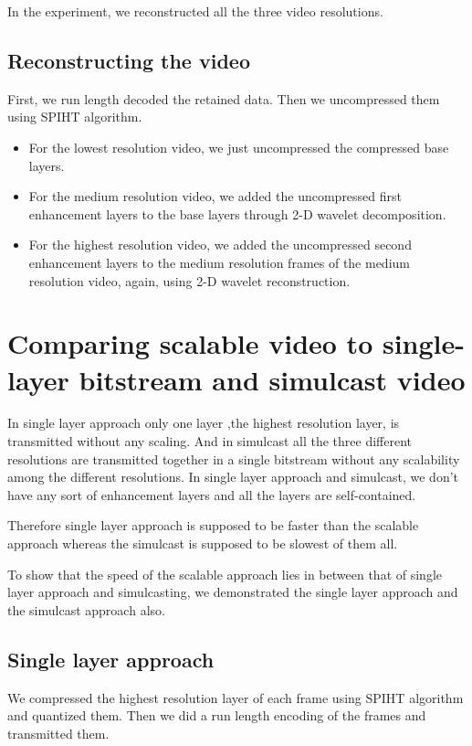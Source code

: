 \documentclass[10pt,twocolumn]{article}
\begin{document}
In the experiment, we reconstructed all the three video resolutions.

\subsection*{Reconstructing the video}
First, we run length decoded the retained data. Then we uncompressed them using SPIHT\cite{amirSaid1996} algorithm. 

\begin{itemize}
    \item For the lowest resolution video, we just uncompressed the compressed base layers.

    \item For the medium resolution video, we added the uncompressed first enhancement layers to the base layers through 2-D wavelet decomposition.

    \item For the highest resolution video, we added the uncompressed second enhancement layers to the medium resolution frames of the medium resolution video, again, using 2-D wavelet reconstruction.
\end{itemize}

\section{Comparing scalable video to single-layer bitstream and simulcast video}

In single layer approach only one layer ,the highest resolution layer, is transmitted without any scaling. And in simulcast all the three different resolutions are transmitted together in a single bitstream without any scalability among the different resolutions. In single layer approach and simulcast, we don't have any sort of enhancement layers and all the layers are self-contained.

Therefore single layer approach is supposed to be faster than the scalable approach whereas the simulcast is supposed to be slowest of them all.

To show that the speed of the scalable approach lies in between that of single layer approach and simulcasting, we demonstrated the single layer approach and the simulcast approach also.

\subsection*{Single layer approach}
We compressed the highest resolution layer of each frame using SPIHT algorithm and quantized them. Then we did a run length encoding of the frames and transmitted them.
\end{document}

